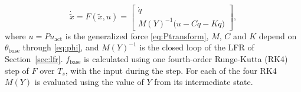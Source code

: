 \begin{equation}
 \dot{\tilde x}=F(\tilde x,u)=\begin{bmatrix}\dot q\\
  M(Y)^{-1}\bigl(u-C\dot q-Kq\bigr)\end{bmatrix},
\label{eq:aug_ct}
\end{equation}
where $u=Pu_{\mathrm{act}}$ is the generalized force
\eqref{eq:Ptransform}, $M$, $C$ and $K$ depend on $\theta_{\mathrm{base}}$
through \eqref{eq:phi}, and $M(Y)^{-1}$ is the closed loop of the LFR of
Section~\ref{sec:lfr}.
$f_{\mathrm{base}}$ is calculated using one fourth-order
Runge-Kutta (RK4) step of $F$ over $T_s$, with the input
 during the step.
For each of the four RK4  $M(Y)$ is evaluated 
using the value of $Y$ from its intermediate state.


